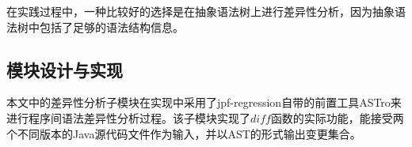 在实践过程中，一种比较好的选择是在抽象语法树上进行差异性分析，因为抽象语法树中包括了足够的语法结构信息。

\subsection{模块设计与实现}
\label {tool_differ}

本文中的差异性分析子模块在实现中采用了jpf-regression自带的前置工具ASTro来进行程序间语法差异性分析过程。该子模块实现了$diff$函数的实际功能，能接受两个不同版本的Java源代码文件作为输入，并以AST的形式输出变更集合。

%
%
%
%
%
%
%
%
%
